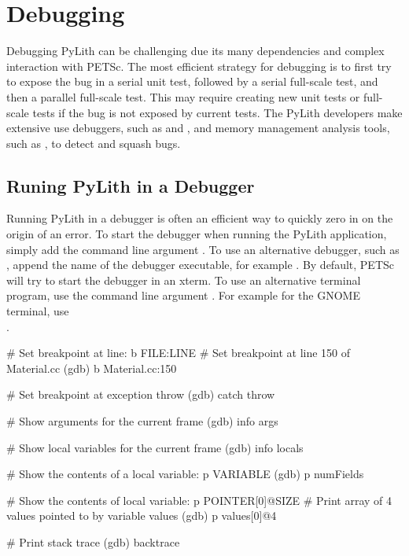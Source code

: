 \section{Debugging}
\label{sec:developer:debugging}

Debugging PyLith can be challenging due its many dependencies and complex interaction with PETSc. The most efficient
strategy for debugging is to first try to expose the bug in a serial unit test, followed by a serial full-scale test,
and then a parallel full-scale test. This may require creating new unit tests or full-scale tests if the bug is not
exposed by current tests. The PyLith developers make extensive use debuggers, such as  and
, and memory management analysis tools, such as , to detect and squash bugs.

\subsection{Runing PyLith in a Debugger}

Running PyLith in a debugger is often an efficient way to quickly zero in on the origin of an error. To start the
 debugger when running the PyLith application, simply add the command line argument
. To use an alternative debugger, such as , append the name
of the debugger executable, for example . By default, PETSc will try to
start the debugger in an xterm. To use an alternative terminal program, use the command line argument
. For example for the
GNOME terminal, use \\
.


\begin{shell}
# Set breakpoint at line: b FILE:LINE
# Set breakpoint at line 150 of Material.cc
(gdb) b Material.cc:150

# Set breakpoint at exception throw
(gdb) catch throw

# Show arguments for the current frame
(gdb) info args

# Show local variables for the current frame
(gdb) info locals

# Show the contents of a local variable: p VARIABLE
(gdb) p numFields

# Show the contents of local variable: p POINTER[0]@SIZE
# Print array of 4 values pointed to by variable values
(gdb) p values[0]@4

# Print stack trace
(gdb) backtrace
\end{shell}

